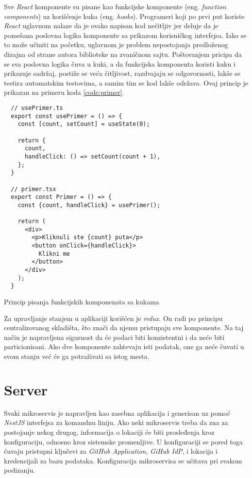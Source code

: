 Sve \textit{React} komponente su pisane kao funkcijske komponente 
(eng. \textit{function components}) uz korišćenje kuka (eng. \textit{hooks}).
Programeri koji po prvi put koriste \textit{React} uglavnom nalaze da je 
ovako napisan kod nečitljiv jer deluje da je pomešana poslovna logika komponente 
sa prikazom korisničkog interfejsa. %
Iako se to može učiniti na početku, uglavnom je 
problem nepostojanja predloženog dizajna od strane autora biblioteke na 
zvaničnom sajtu. Poštovanjem pricipa da se sva poslovna logika %
čuva u kuki, a da funkcijska komponenta koristi kuku i prikazuje sadržaj, 
postiže se veća čitljivost, razdvajaju se odgovornosti, lakše se testira 
automatskim testovima, a samim tim se kod lakše održava. 
Ovaj princip je prikazan na primeru koda \ref{code:primer}.
\begin{listing}[h]
  \centering
  \begin{verbatim}
  // usePrimer.ts
  export const usePrimer = () => {
    const [count, setCount] = useState(0);

    return {
      count,
      handleClick: () => setCount(count + 1),
    };
  }

  // primer.tsx
  export const Primer = () => {
    const {count, handleClick} = usePrimer();

    return (
      <div>
        <p>Kliknuli ste {count} puta</p>
        <button onClick={handleClick}>
          Klikni me
        </button>
      </div>
    );
  }
  \end{verbatim}
\caption{Princip pisanja funkcijskih komponenata sa kukama}
\label{code:primer}
\end{listing}

Za upravljanje stanjem u aplikaciji korišćen je \textit{redux}. On radi 
po principu centralizovanog skladišta, što znači da njemu pristupaju sve 
komponente. Na taj način je napravljena sigurnost da će podaci biti konzistentni 
i da neće biti particionisani. Ako dve komponente zahtevaju isti podatak, one ga neće čuvati u svom stanju 
već će ga potraživati sa istog mesta.

\section{Server}
Svaki mikroservis je napravljen kao zasebna aplikacija i generisan uz pomoć 
\textit{NestJS} interfejsa za komandnu liniju. Ako neki mikroservis treba 
da zna za postojanje nekog drugog, informacija o lokaciji će biti prosleđenja 
kroz konfiguraciju, odnosno kroz sistemske promenljive. U konfiguraciji 
se pored toga čuvaju pristupni ključevi za \textit{GitHub Application}, 
\textit{GiHub IdP}, i lokacija i kredencijali za bazu podataka. Konfiguracija 
mikroservisa se učitava pri svakom podizanju.

